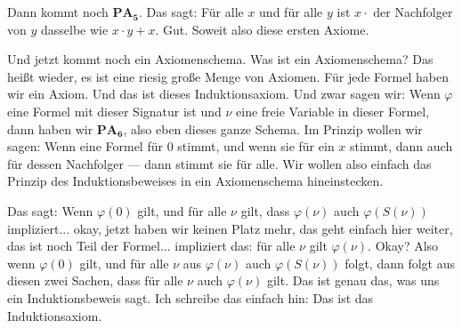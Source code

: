 \begin{spoken-clean}[00:11:00 - 00:15:10]
Dann kommt noch $\textbf{PA}_{  \textbf{5}}$. Das sagt: Für alle $x$ und für alle $y$ ist $x \cdot$ der Nachfolger von $y$ dasselbe wie $x \cdot y + x$. Gut. Soweit also diese ersten Axiome.

Und jetzt kommt noch ein Axiomenschema. Was ist ein Axiomenschema? Das heißt wieder, es ist eine riesig große Menge von Axiomen. Für jede Formel haben wir ein Axiom. Und das ist dieses Induktionsaxiom. Und zwar sagen wir: Wenn $\varphi$ eine Formel mit dieser Signatur ist und $\nu$ eine freie Variable in dieser Formel, dann haben wir $\textbf{PA}_{\textbf{6}}$, also eben dieses ganze Schema. Im Prinzip wollen wir sagen: Wenn eine Formel für $0$ stimmt, und wenn sie für ein $x$ stimmt, dann auch für dessen Nachfolger --- dann stimmt sie für alle. Wir wollen also einfach das Prinzip des Induktionsbeweises in ein Axiomenschema hineinstecken.

Das sagt: Wenn $\varphi(0)$ gilt, und für alle $\nu$ gilt, dass $\varphi(\nu)$ auch $\varphi(S(\nu))$ impliziert... okay, jetzt haben wir keinen Platz mehr, das geht einfach hier weiter, das ist noch Teil der Formel... impliziert das: für alle $\nu$ gilt $\varphi(\nu)$. Okay? Also wenn $\varphi(0)$ gilt, und für alle $\nu$ aus $\varphi(\nu)$ auch $\varphi(S(\nu))$ folgt, dann folgt aus diesen zwei Sachen, dass für alle $\nu$ auch $\varphi(\nu)$ gilt. Das ist genau das, was uns ein Induktionsbeweis sagt. Ich schreibe das einfach hin: Das ist das Induktionsaxiom.
\end{spoken-clean}



